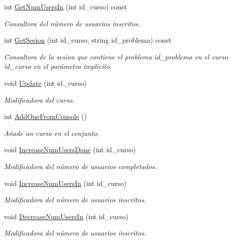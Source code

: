 \begin{DoxyCompactItemize}
int \mbox{\hyperlink{class_course_set_a72b6a09b4eafce672b57abebfa9f1f55}{Get\+Num\+Users\+In}} (int id\+\_\+curso) const
\begin{DoxyCompactList}\small\item\em Consultora del número de usuarios inscritos. \end{DoxyCompactList}\item 
int \mbox{\hyperlink{class_course_set_a534fa228ab549072198b0966d159a530}{Get\+Sesion}} (int id\+\_\+curso, string id\+\_\+problema) const
\begin{DoxyCompactList}\small\item\em Consultora de la sesion que contiene el problema id\+\_\+problema en el curso id\+\_\+curso en el parámetro implícito. \end{DoxyCompactList}\item 
void \mbox{\hyperlink{class_course_set_a96eb35134feb996fdef57895074a33ff}{Update}} (int id\+\_\+curso)
\begin{DoxyCompactList}\small\item\em Modificadora del curso. \end{DoxyCompactList}\item 
int \mbox{\hyperlink{class_course_set_ae74448a3ba72c104d4f35abf41d47b0e}{Add\+One\+From\+Console}} ()
\begin{DoxyCompactList}\small\item\em Añade un curso en el conjunto. \end{DoxyCompactList}\item 
void \mbox{\hyperlink{class_course_set_ade38257bb2809e6b8a2b062796c69e53}{Increase\+Num\+Users\+Done}} (int id\+\_\+curso)
\begin{DoxyCompactList}\small\item\em Modificadora del número de usuarios completados. \end{DoxyCompactList}\item 
void \mbox{\hyperlink{class_course_set_a6a1532272c28fcb228bae6b9bde47c4e}{Increase\+Num\+Users\+In}} (int id\+\_\+curso)
\begin{DoxyCompactList}\small\item\em Modificadora del número de usuarios inscritos. \end{DoxyCompactList}\item 
void \mbox{\hyperlink{class_course_set_ab24913a21a3fd64d67346668dbf9159c}{Decrease\+Num\+Users\+In}} (int id\+\_\+curso)
\begin{DoxyCompactList}\small\item\em Modificadora del número de usuarios inscritos. \end{DoxyCompactList}\item 

\end{DoxyCompactItemize}
